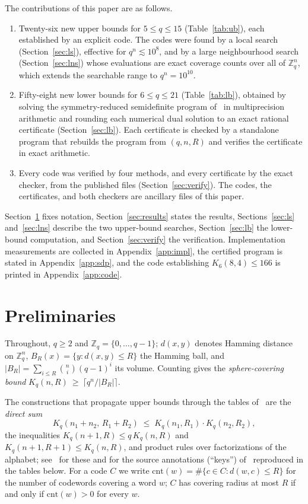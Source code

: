 \documentclass[11pt]{amsart}
\newcommand{\Kq}[3]{K_{#1}(#2,#3)}
\newcommand{\Zq}{\mathbb{Z}_q}
\begin{document}
The contributions of this paper are as follows.
\begin{enumerate}
\item Twenty-six new upper bounds for $5\le q\le 15$
(Table~\ref{tab:ub}), each established by an explicit code. The codes were
found by a local search (Section~\ref{sec:ls}), effective for $q^n\lesssim
10^8$, and by a large neighbourhood search (Section~\ref{sec:lns}) whose
evaluations are exact coverage counts over all of $\Zq^n$, which extends
the searchable range to $q^n=10^{10}$.
\item Fifty-eight new lower bounds for $6\le q\le 21$
(Table~\ref{tab:lb}), obtained by solving the symmetry-reduced semidefinite
program of~\cite{GijswijtPolak} in multiprecision arithmetic and rounding
each numerical dual solution to an exact rational certificate
(Section~\ref{sec:lb}). Each certificate is checked by a standalone program
that rebuilds the program from $(q,n,R)$ and verifies the certificate in
exact arithmetic.
\item Every code was verified by four methods, and every certificate by
the exact checker, from the published files
(Section~\ref{sec:verify}). The codes, the certificates, and both checkers
are ancillary files of this paper.
\end{enumerate}

Section~\ref{sec:prelim} fixes notation, Section~\ref{sec:results} states
the results, Sections~\ref{sec:ls} and~\ref{sec:lns} describe the two
upper-bound searches, Section~\ref{sec:lb} the lower-bound computation, and
Section~\ref{sec:verify} the verification. Implementation measurements are
collected in Appendix~\ref{app:impl}, the certified program is stated in
Appendix~\ref{app:sdp}, and the code establishing $\Kq{6}{8}{4}\le 166$ is
printed in Appendix~\ref{app:code}.

\section{Preliminaries}\label{sec:prelim}

Throughout, $q\ge 2$ and $\Zq=\{0,\dots,q-1\}$; $d(x,y)$ denotes Hamming
distance on $\Zq^n$, $B_R(x)=\{y: d(x,y)\le R\}$ the Hamming ball, and
$|B_R|=\sum_{i\le R}\binom{n}{i}(q-1)^i$ its volume. Counting gives the
\emph{sphere-covering bound}
$K_q(n,R)\ \ge\ \lceil q^n/|B_R|\rceil$.

The constructions that propagate upper bounds through the tables
of~\cite{Keri} are the \emph{direct sum}
\begin{equation}\label{eq:directsum}
K_q(n_1+n_2,\,R_1+R_2)\;\le\;K_q(n_1,R_1)\cdot K_q(n_2,R_2),
\end{equation}
the inequalities $K_q(n+1,R)\le q\,K_q(n,R)$ and $K_q(n+1,R+1)\le
K_q(n,R)$, and product rules over factorizations of the alphabet;
see~\cite{CHLL,Keri} for these and for the source annotations (``keys'')
of~\cite{Keri} reproduced in the tables below. For a code $C$ we write
$\mathrm{cnt}(w)=\#\{c\in C: d(w,c)\le R\}$ for the number of codewords
covering a word $w$; $C$ has covering radius at most $R$ if and only if
$\mathrm{cnt}(w)>0$ for every $w$.
\end{document}

